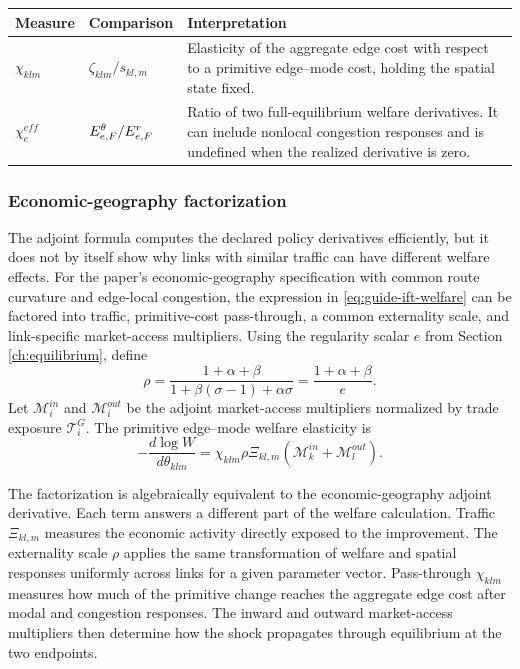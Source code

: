 \begin{longtable}{L{0.20\textwidth}L{0.31\textwidth}L{0.39\textwidth}}
\toprule
Measure & Comparison & Interpretation \\
\midrule
\endhead
\(\chi_{klm}\) &
\(\zeta_{klm}/s_{kl,m}\) &
Elasticity of the aggregate edge cost with respect to a primitive edge--mode
cost, holding the spatial state fixed. \\
\(\chi_e^{eff}\) &
\(E^{\theta}_{e,F}/E^{r}_{e,F}\) &
Ratio of two full-equilibrium welfare derivatives. It can include nonlocal
congestion responses and is undefined when the realized derivative is zero. \\
\bottomrule
\end{longtable}

\subsubsection{Economic-geography factorization}

The adjoint formula computes the declared policy derivatives efficiently, but
it does not by itself show why links with similar traffic can have different
welfare effects. For the paper's economic-geography specification with common route
curvature and edge-local congestion, the expression in
\eqref{eq:guide-ift-welfare} can be factored into traffic, primitive-cost
pass-through, a common externality scale, and link-specific market-access
multipliers. Using the regularity scalar \(e\) from Section
\ref{ch:equilibrium},
\citet{AllenFuchsWong2026} define
\[
 \rho=\frac{1+\alpha+\beta}
 {1+\beta(\sigma-1)+\alpha\sigma}
 =\frac{1+\alpha+\beta}{e}.
\]
Let \(\mathcal M_i^{in}\) and \(\mathcal M_i^{out}\) be the adjoint
market-access multipliers normalized by trade exposure
\(\mathcal T_i^G\). The primitive edge--mode welfare elasticity is
\begin{equation}
 -\frac{d\log W}{d\theta_{klm}}
 =\chi_{klm}\rho\Xi_{kl,m}
 \left(\mathcal M_k^{in}+\mathcal M_l^{out}\right).
\label{eq:guide-prop2}
\end{equation}

The factorization is algebraically equivalent to the economic-geography
adjoint derivative. Each term answers a different part of the welfare
calculation. Traffic \(\Xi_{kl,m}\) measures the economic activity directly
exposed to the improvement. The externality scale \(\rho\) applies the same
transformation of welfare and spatial responses uniformly across links for a
given parameter vector. Pass-through \(\chi_{klm}\) measures how much of the primitive
change reaches the aggregate edge cost after modal and congestion responses.
The inward and outward market-access multipliers then determine how the shock
propagates through equilibrium at the two endpoints.

